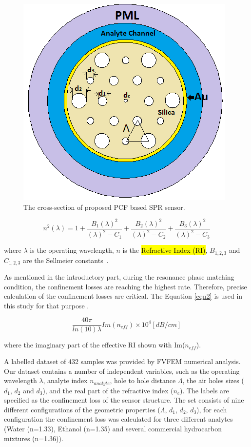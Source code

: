 \documentclass[journal]{IEEEtran}
\begin{document}
\begin{figure}[]
	\centering
	\includegraphics[width=.7\linewidth]{figures/Figx}
	\caption{The cross-section of proposed  PCF based SPR sensor.}
	\label{Figx}
\end{figure}




\begin{equation}
n^2(\lambda)=1+\frac{ B_1 (\lambda)^2} {(\lambda)^2-C_1} + \frac{ B_2 (\lambda)^2} {(\lambda)^2-C_2} + \frac{ B_3 (\lambda)^2} {(\lambda)^2-C_3}
\label{eqn1}
\end{equation}

where $\lambda$ is the operating wavelength, $n$ is the \hl{Refractive Index (RI)}, $B_{1,2,3}$ and  $C_{1,2,3}$ are the  Sellmeier constants~\cite{bjarklev2003PCF}.

As mentioned in the introductory part, during the resonance phase matching condition, the confinement losses are reaching the highest rate. Therefore, precise calculation of the confinement losses are critical. The Equation \ref{eqn2} is used in this study for that purpose \cite{yasli2019effect}.



\begin{equation}
\frac{40\pi}{ln(10) \lambda} Im(n_{eff}) \times 10^{4} [dB/cm]
\label{eqn2}
\end{equation}

where the imaginary part of the effective RI shown with Im($n_{eff}$).

A labelled dataset of 432 samples was provided by FVFEM numerical analysis. Our dataset contains a number of independent variables, such as the operating wavelength  $\lambda$, analyte index $n_{analyte}$, hole to hole distance $\Lambda$, the air holes sizes ($d_1$, $d_2$ and $d_3$), and the real part of the refractive index ($n_c$). The labels are specified as the confinement loss of the sensor structure. The set consists of nine different configurations of the geometric properties ($\Lambda$, $d_1$, $d_2$, $d_3$), for each configuration the confinement loss was calculated for three different analytes (Water (n=1.33), Ethanol (n=1.35) and several commercial hydrocarbon mixtures (n=1.36)).
\end{document}
